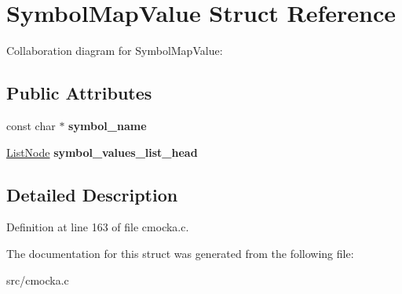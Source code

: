 \hypertarget{structSymbolMapValue}{}\section{Symbol\+Map\+Value Struct Reference}
\label{structSymbolMapValue}


Collaboration diagram for Symbol\+Map\+Value\+:
\subsection*{Public Attributes}
\begin{DoxyCompactItemize}
\item 
\mbox{\label{structSymbolMapValue_a7d187f5727db7dc9352464d3bf803320}} 
const char $\ast$ {\bfseries symbol\+\_\+name}
\item 
\mbox{\label{structSymbolMapValue_aa5dec3b9736433e5ec2a8809a1032b23}} 
\hyperlink{structListNode}{List\+Node} {\bfseries symbol\+\_\+values\+\_\+list\+\_\+head}
\end{DoxyCompactItemize}


\subsection{Detailed Description}


Definition at line 163 of file cmocka.\+c.



The documentation for this struct was generated from the following file\+:\begin{DoxyCompactItemize}
\item 
src/cmocka.\+c\end{DoxyCompactItemize}
